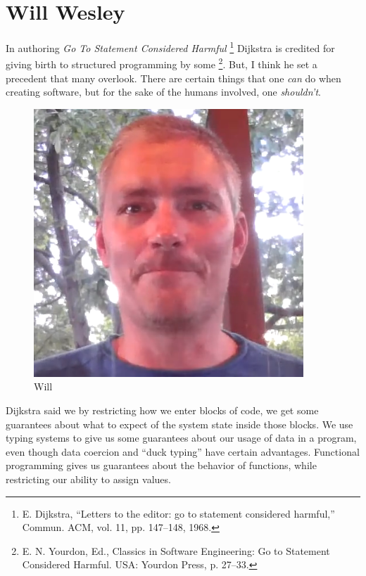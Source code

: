 \section{Will Wesley}

In authoring \emph{Go To Statement Considered Harmful}
\footnote{E. Dijkstra, “Letters to the editor: go to statement considered harmful,” Commun. ACM, vol. 11, pp. 147–148, 1968.}
Dijkstra is credited for giving birth to structured programming by some
\footnote{E. N. Yourdon, Ed., Classics in Software Engineering: Go to Statement Considered Harmful.
USA: Yourdon Press, p. 27–33.}.
But, I think he set a precedent that many overlook.
There are certain things that one \emph{can} do when creating software, but for the sake of the humans involved, one \emph{shouldn't}.

\begin{figure}
  \includegraphics[width=\linewidth]{Wesley}
  \caption{Will}
  \label{fig:will}
\end{figure}
Dijkstra said we by restricting how we enter blocks of code, we get some guarantees about what to expect of the system state inside those blocks.
We use typing systems to give us some guarantees about our usage of data in a program, even though data coercion and ``duck typing'' have certain advantages.
Functional programming gives us guarantees about the behavior of functions, while restricting our ability to assign values.

